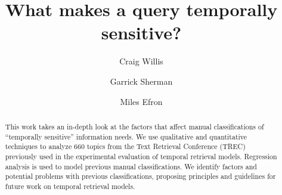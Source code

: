 \documentclass[runningheads,a4paper]{llncs}
\begin{document}
\mainmatter  %

\title{What makes a query temporally sensitive?}


%
%

\author{Craig Willis \and Garrick Sherman \and Miles Efron}

\authorrunning{}


%
%

\maketitle


\begin{abstract}

This work takes an in-depth look at the factors that affect manual classifications of ``temporally sensitive'' information needs. We use qualitative and quantitative techniques to analyze 660 topics from the Text Retrieval Conference (TREC) previously used in the experimental evaluation of temporal retrieval models.  Regression analysis is used to model previous manual classifications. We identify factors and potential problems with previous classifications, proposing principles and guidelines for future work on temporal retrieval models.

\end{abstract}
\end{document}
